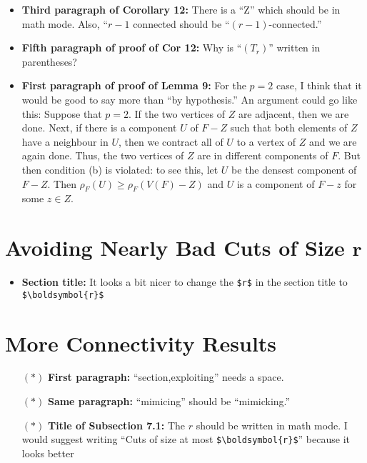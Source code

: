 \documentclass[11 pt]{article}
\begin{document}
\begin{itemize}
\item \textbf{Third paragraph of Corollary 12:} There is a ``Z'' which should be in math mode. Also, ``$r-1$ connected should be ``$(r-1)$-connected.'' 
\item \textbf{Fifth paragraph of proof of Cor 12:} Why is ``$(T_r)$'' written in parentheses? 
\item \textbf{First paragraph of proof of Lemma 9:} For the $p=2$ case, I think that it would be good to say more than ``by hypothesis.'' An argument could go like this: Suppose that $p=2$. If the two vertices of $Z$ are adjacent, then we are done. Next, if there is a component $U$ of $F-Z$ such that both elements of $Z$ have a neighbour in $U$, then we contract all of $U$ to a vertex of $Z$ and we are again done. Thus, the two vertices of $Z$ are in different components of $F$. But then condition (b) is violated: to see this, let $U$ be the densest component of $F-Z$. Then $\rho_F(U) \geq \rho_F(V(F)-Z)$ and $U$ is a component of $F-z$ for some $z\in Z$. 
\end{itemize}

\section{Avoiding Nearly Bad Cuts of Size $\boldsymbol{r}$}

\begin{itemize}
\item \textbf{Section title:} It looks a bit nicer to change the \texttt{\$r\$} in the section title to \texttt{\$\textbackslash{boldsymbol}\{r\}\$}
\end{itemize}

\section{More Connectivity Results}

\begin{itemize}
\item[$\boldsymbol{(*)}$] \textbf{First paragraph:} ``section,exploiting'' needs a space.
\item[$\boldsymbol{(*)}$] \textbf{Same paragraph:} ``mimicing'' should be ``mimicking.''
\item[$\boldsymbol{(*)}$] \textbf{Title of Subsection 7.1:} The $r$ should be written in math mode. I would suggest writing ``Cuts of size at most \texttt{\$\textbackslash{boldsymbol}\{r\}\$}'' because it looks better
\end{itemize}
\end{document}
